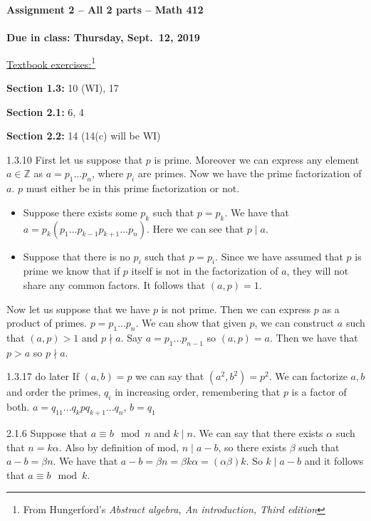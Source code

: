 \documentclass[12pt]{article}
\newcommand{\headdd}[2]{\textbf{Assignment #1 -- #2 -- Math 412}}
\newcommand{\headddf}[3]{\textbf{Assignment #1 -- All #2 parts -- Math 412}\\ \mbox{}\\ \textbf{Due in class: Thursday, #3}}
\begin{document}
\begin{center}
\headddf{2}{2}{Sept.\ 12, 2019}
\end{center}

\underline{Textbook exercises:}\footnote{From Hungerford's \textit{Abstract algebra, An introduction, Third edition}}

\textbf{Section 1.3:} 10 (WI), 17

\textbf{Section 2.1:} 6, 4

\textbf{Section 2.2:} 14 (14(c) will be WI)														

\begin{section}{1.3.10}
	First let us suppose that $p$ is prime.  Moreover we can express any element $a \in \mathbb{Z}$ as $a = p_1...p_n$, where $p_i$ are primes.  Now we have the prime factorization of $a$.  $p$ must either be in this prime factorization or not.
	\begin{itemize}
		\item Suppose there exists some $p_k$ such that $p = p_k$.  We have that $a = p_k(p_1...p_{k-1}p_{k+1}...p_n)$.  Here we can see that $p \mid a$.
		\item Suppose that there is no $p_i$ such that $p = p_i$.  Since we have assumed that $p$ is prime we know that if $p$ itself is not in the factorization of $a$, they will not share any common factors.  It follows that $(a,p) = 1$.  
	\end{itemize}

	\noindent Now let us suppose that we have $p$ is not prime.  Then we can express $p$ as a product of primes.  $p = p_1...p_n$.  We can show that given $p$, we can construct $a$ such that $(a,p) > 1$ and $p \nmid a$.  Say $a = p_1...p_{n-1}$ so $(a, p) = a$.  Then we have that $p > a$ so $p \nmid a$.
\end{section}
\begin{section}{1.3.17 do later}
	If $(a,b) = p$ we can say that $(a^2, b^2) = p^2$.  We can factorize $a,b$ and order the primes, $q_i$ in increasing order, remembering that $p$ is a factor of both.  $a = q_11...q_{k}pq_{k + 1}...q_n$, $b = q_1$
\end{section}
\begin{section}{2.1.6}
	Suppose that $a \equiv b \mod{n}$ and $k \mid n$.  We can say that there exists $\alpha$ such that $n = k\alpha$.  Also by definition of mod, $n \mid a-b$, so there exists $\beta$ such that $a-b = \beta n$.  We have that $a - b = \beta n = \beta k \alpha = (\alpha\beta)k$.  So $k \mid a-b$ and it follows that $a \equiv b \mod{k}$.
\end{section}
\end{document}
